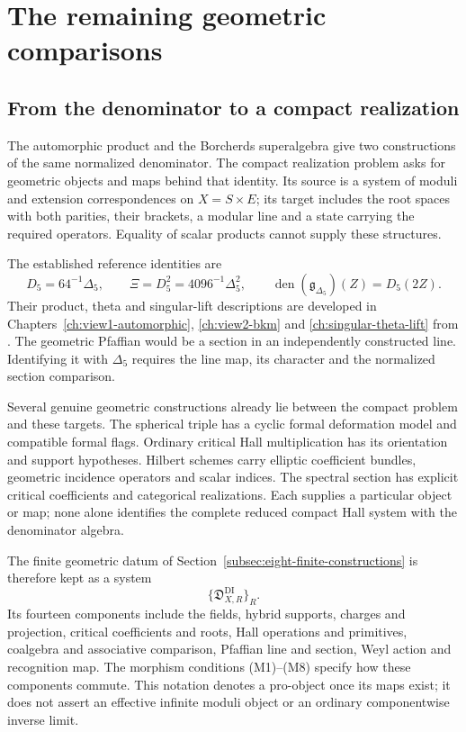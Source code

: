 \chapter{The remaining geometric comparisons}
\label{ch:open-obstructions}

\section{From the denominator to a compact realization}
\label{sec:open-obstructions-and-subsequent-constructions}

The automorphic product and the Borcherds superalgebra give two
constructions of the same normalized denominator. The compact
realization problem asks for geometric objects and maps behind that
identity. Its source is a system of moduli and extension
correspondences on \(X=S\times E\); its target includes the root
spaces with both parities, their brackets, a modular line and a
state carrying the required operators. Equality of scalar products
cannot supply these structures.

The established reference identities are
\[
 D_5=64^{-1}\Delta_5,\qquad
 \Xi=D_5^2=4096^{-1}\Delta_5^2,
 \qquad
 \operatorname{den}(\mathfrak g_{\Delta_5})(Z)=D_5(2Z).
\]
Their product, theta and singular-lift descriptions are developed
in Chapters~\ref{ch:view1-automorphic}, \ref{ch:view2-bkm} and
\ref{ch:singular-theta-lift} from \cite{Borcherds95,GN}.
The geometric Pfaffian would be a section in an independently
constructed line. Identifying it with \(\Delta_5\) requires the
line map, its character and the normalized section comparison.

Several genuine geometric constructions already lie between the
compact problem and these targets. The spherical triple has a
cyclic formal deformation model and compatible formal flags.
Ordinary critical Hall multiplication has its orientation and
support hypotheses. Hilbert schemes carry elliptic coefficient
bundles, geometric incidence operators and scalar indices.
The spectral section has explicit critical coefficients and
categorical realizations. Each supplies a particular object or map;
none alone identifies the complete reduced compact Hall system
with the denominator algebra.

The finite geometric datum of
Section~\ref{subsec:eight-finite-constructions} is therefore kept
as a system
\[
 \{\mathfrak D^{\mathrm{DI}}_{X,R}\}_R.
\]
Its fourteen components include the fields, hybrid supports,
charges and projection, critical coefficients and roots, Hall
operations and primitives, coalgebra and associative comparison,
Pfaffian line and section, Weyl action and recognition map.
The morphism conditions \textup{(M1)}--\textup{(M8)} specify how
these components commute. This notation denotes a pro-object
once its maps exist; it does not assert an effective infinite
moduli object or an ordinary componentwise inverse limit.


